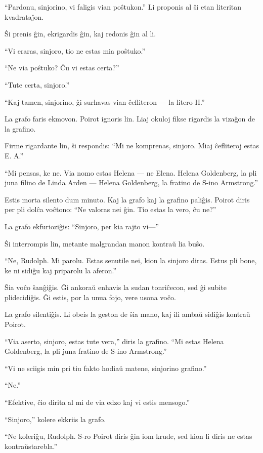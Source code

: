 ``Pardonu, sinjorino, vi faligis vian poŝtukon.'' Li proponis al ŝi etan literitan kvadrataĵon.

Ŝi prenis ĝin, ekrigardis ĝin, kaj redonis ĝin al li.

``Vi eraras, sinjoro, tio ne estas mia poŝtuko.''

``Ne via poŝtuko? Ĉu vi estas certa?''

``Tute certa, sinjoro.''

``Kaj tamen, sinjorino, ĝi surhavas vian ĉefliteron --- la litero H.''

La grafo faris ekmovon. Poirot ignoris lin. Liaj okuloj fikse rigardis la vizaĝon de la grafino.

Firme rigardante lin, ŝi respondis: ``Mi ne komprenas, sinjoro. Miaj ĉefliteroj estas E. A.''

``Mi pensas, ke ne. Via nomo estas Helena --- ne Elena. Helena Goldenberg, la pli juna filino de Linda Arden --- Helena Goldenberg, la fratino de S-ino Armstrong.''

Estis morta silento dum minuto. Kaj la grafo kaj la grafino paliĝis. Poirot diris per pli dolĉa voĉtono: ``Ne valoras nei ĝin. Tio estas la vero, ĉu ne?''

La grafo ekfurioziĝis: ``Sinjoro, per kia rajto vi---''

Ŝi interrompis lin, metante malgrandan manon kontraŭ lia buŝo.

``Ne, Rudolph. Mi parolu. Estas senutile nei, kion la sinjoro diras. Estus pli bone, ke ni sidiĝu kaj priparolu la aferon.''

Ŝia voĉo ŝanĝiĝis. Ĝi ankoraŭ enhavis la sudan tonriĉecon, sed ĝi subite plidecidiĝis. Ĝi estis, por la unua fojo, vere usona voĉo.

La grafo silentiĝis. Li obeis la geston de ŝia mano, kaj ili ambaŭ sidiĝis kontraŭ Poirot.

``Via aserto, sinjoro, estas tute vera,'' diris la grafino. ``Mi estas Helena Goldenberg, la pli juna fratino de S-ino Armstrong.''

``Vi ne sciigis min pri tiu fakto hodiaŭ matene, sinjorino grafino.''

``Ne.''

``Efektive, ĉio dirita al mi de via edzo kaj vi estis mensogo.''

``Sinjoro,'' kolere ekkriis la grafo.

``Ne koleriĝu, Rudolph. S-ro Poirot diris ĝin iom krude, sed kion li diris ne estas kontraŭstarebla.''

